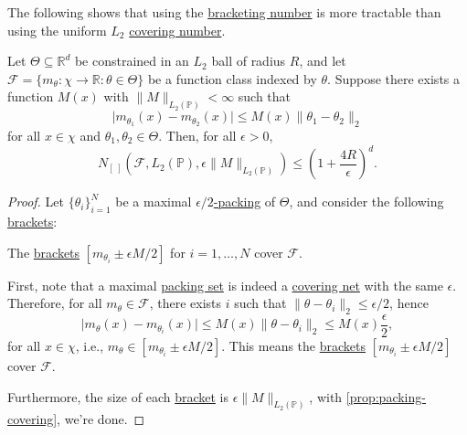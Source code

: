 The following shows that using the \hyperref[def:bracketing-number]{bracketing number} is more tractable than using the uniform \(L_2\) \hyperref[def:covering-number]{covering number}.

\begin{lemma}\label{lma:parametric-Lipschitz}
	Let \(\Theta \subseteq \mathbb{R} ^d\) be constrained in an \(L_2\) ball of radius \(R\), and let \(\mathscr{F} = \{ m_\theta \colon \chi \to \mathbb{R} \colon \theta \in \Theta  \} \) be a function class indexed by \(\theta \). Suppose there exists a function \(M(x)\) with \(\lVert M \rVert _{L_2(\mathbb{P} )} < \infty \) such that
	\[
		\vert m_{\theta _1}(x) - m_{\theta _2}(x) \vert
		\leq M(x) \lVert \theta _1 - \theta _2 \rVert _2
	\]
	for all \(x\in \chi \) and \(\theta _1, \theta _2 \in \Theta \). Then, for all \(\epsilon > 0\),
	\[
		N_{[\ ]}(\mathscr{F} , L_2(\mathbb{P} ), \epsilon \lVert M \rVert _{L_2(\mathbb{P} )}) \leq \left( 1 + \frac{4R}{\epsilon } \right) ^d.
	\]
\end{lemma}
\begin{proof}
	Let \(\{ \theta _i \}_{i=1}^N\) be a maximal \hyperref[def:eps-packing]{\(\epsilon / 2\)-packing} of \(\Theta \), and consider the following \hyperref[def:eps-bracket]{brackets}:

	\begin{claim}
		The \hyperref[def:eps-bracket]{brackets} \([m_{\theta _i} \pm \epsilon M / 2]\) for \(i = 1, \dots , N\) cover \(\mathscr{F} \).
	\end{claim}
	\begin{explanation}
		First, note that a maximal \hyperref[def:eps-packing]{packing set} is indeed a \hyperref[def:eps-net]{covering net} with the same \(\epsilon \). Therefore, for all \(m_\theta \in \mathscr{F} \), there exists \(i\) such that \(\lVert \theta - \theta _i \rVert _2 \leq \epsilon / 2\), hence
		\[
			\vert m_\theta (x) - m_{\theta _i}(x) \vert
			\leq M(x) \lVert \theta - \theta _i \rVert _2
			\leq M(x) \frac{\epsilon}{2},
		\]
		for all \(x\in \chi \), i.e., \(m_\theta \in [m_{\theta _i} \pm \epsilon M / 2]\). This means the \hyperref[def:eps-bracket]{brackets} \([m_{\theta _i} \pm \epsilon M / 2]\) cover \(\mathscr{F} \).
	\end{explanation}
	Furthermore, the size of each \hyperref[def:eps-bracket]{bracket} is \(\epsilon \lVert M \rVert _{L_2(\mathbb{P} )}\), with \autoref{prop:packing-covering}, we're done.
\end{proof}

